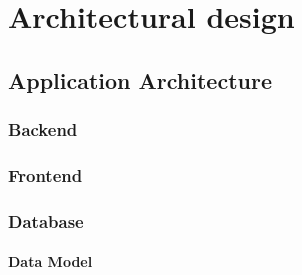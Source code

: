 \chapter{Architectural design}
\label{chap:architectural-design}

\section{Application Architecture}
\label{sec:application-architecture}
\subsection{Backend}
\label{subsec:backend}
\subsection{Frontend}
\label{subsec:frontend}
\subsection{Database}
\label{subsec:database}
\subsubsection{Data Model}
\label{subsubsec:data-model}
